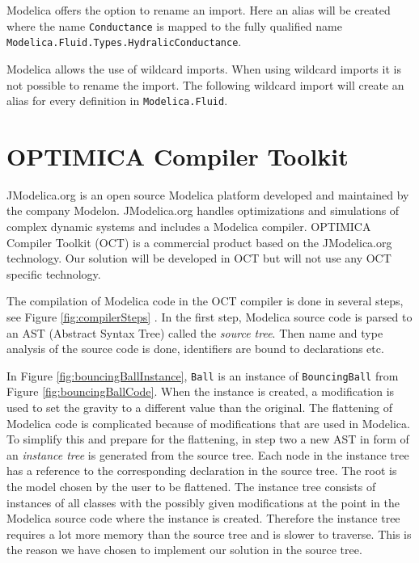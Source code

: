 \documentclass{cslthse-msc}
\begin{document}


Modelica offers the option to rename an import. Here an alias will be created where the name \texttt{Conductance} is mapped to the fully qualified name \\\texttt{Modelica.Fluid.Types.HydralicConductance}.



Modelica allows the use of wildcard imports. When using wildcard imports it is not possible to rename the import. The following wildcard import will create an alias for every definition in \texttt{Modelica.Fluid}.



\section{OPTIMICA Compiler Toolkit}
JModelica.org is an open source Modelica platform developed and maintained by the company Modelon. JModelica.org handles optimizations and simulations of complex dynamic systems and includes a Modelica compiler. OPTIMICA Compiler Toolkit (OCT) is a commercial product based on the JModelica.org technology. Our solution will be developed in OCT but will not use any OCT specific technology. 

The compilation of Modelica code in the OCT compiler is done in several steps, see Figure \ref{fig:compilerSteps} \cite{aakesson2010implementation}. In the first step, Modelica source code is parsed to an AST (Abstract Syntax Tree) called the \emph{source tree}. Then name and type analysis of the source code is done, identifiers are bound to declarations etc.

In Figure \ref{fig:bouncingBallInstance}, \texttt{Ball} is an instance of \texttt{BouncingBall} from Figure \ref{fig:bouncingBallCode}. When the instance is created, a modification is used to set the gravity to a different value than the original. The flattening of Modelica code is complicated because of modifications that are used in Modelica. To simplify this and  prepare for the flattening, in step two a new AST in form of an \emph{instance tree} is generated from the source tree. Each node in the instance tree has a reference to the corresponding declaration in the source tree. The root is the model chosen by the user to be flattened. The instance tree consists of instances of all classes with the possibly given modifications at the point in the Modelica source code where the instance is created. Therefore the instance tree requires a lot more memory than the source tree and is slower to traverse. This is the reason we have chosen to implement our solution in the source tree. 
\end{document}
